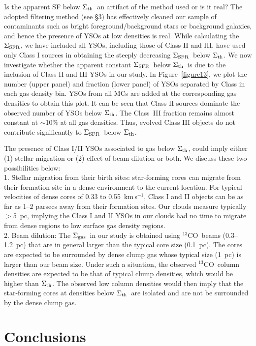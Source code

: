 \documentclass[iop]{emulateapj}
\newcommand{\sigsfr}{$\Sigma_{\rm SFR}$}
\newcommand{\siggas}{$\Sigma_{\rm gas}$}
\newcommand{\sigth}{$\Sigma_{\rm th}$}
\newcommand{\co}{$^{13}$CO}
\newcommand{\kms}{km\,s$^{-1}$}
\begin{document}
Is the apparent SF below \sigth\ an artifact of the method used or is it real?
The adopted filtering method (see \S3) has effectively cleaned our sample of
contaminants such as bright foreground/background stars or background galaxies,
and hence the presence of YSOs at low densities is real. While calculating
the \sigsfr, we have included all YSOs, including those of Class II and III. 
\citet{heiderman+10} have used only Class I sources in obtaining the steeply
decreasing \sigsfr\ below \sigth. We now investigate whether the apparent
constant \sigsfr\ below \sigth\ is due to the inclusion of Class II and III
YSOs in our study. In Figure~\ref{figure13}, we plot the number (upper panel) 
and fraction (lower panel) of YSOs separated by Class in each gas density bin. 
YSOs from all MCs are added at the corresponding gas densities to obtain 
this plot. It can be seen that Class II sources dominate the observed number 
of YSOs below \sigth. The Class~III fraction remains almost constant at 
$\sim$10\% at all gas densities. Thus, evolved Class III objects do not 
contribute significantly to \sigsfr\ below \sigth.


The presence of Class I/II YSOs associated to gas below \sigth, could imply 
either (1) stellar migration or (2) effect of beam dilution or both.
We discuss these two possibilities below: \\
1. Stellar migration from their birth sites: star-forming cores can migrate from
their formation site in a dense environment to the current location. For typical 
velocities of dense cores of 0.33 to 0.55~\kms \citep{muench+07,kirk+10}, 
Class I and II objects can be as far as 1--2 parsecs away from their formation 
sites. Our clouds measure
typically $>$5~pc, implying the Class I and II YSOs in our clouds had no time
to migrate from dense regions to low surface gas density regions. \\
%
2. Beam dilution: The \siggas\ in our study is obtained using \co\ beams 
(0.3--1.2~pc) that are in general larger than the typical core size (0.1~pc). 
The cores are expected to be surrounded by dense clump gas whose typical
size (1~pc) is larger than our beam size. Under such a situation, the observed
\co\ column densities are expected to be that of typical clump densities, which
would be higher than \sigth. The observed low column densities would
then imply that the star-forming cores at densities below \sigth\ 
are isolated and are not be surrounded by the dense clump gas.

\section{Conclusions}
\end{document}
